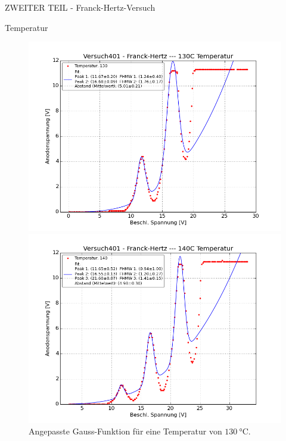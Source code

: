 \begin{appendix}
\begin{chapter}{ZWEITER TEIL - Franck-Hertz-Versuch}
\begin{section}{Temperatur}
      
      \newpage
      \begin{figure}[ht!]
        \centering
        \begin{minipage}{0.48\textwidth}
          \centering
          \includegraphics[width=\textwidth]
              {Figures/Versuch401-Franck-Hertz-130CTemperatur_Beschl_Spannung_Anodenspannung.png}
          \caption{Angepasste Gauss-Funktion für eine Temperatur von 
              $\SI{130}{\celsius}$.}
          \label{fig:AnhangFHT130C}
        \end{minipage} \quad
        \begin{minipage}{0.48\textwidth}
          \centering
          \includegraphics[width=\textwidth]
              {Figures/Versuch401-Franck-Hertz-140CTemperatur_Beschl_Spannung_Anodenspannung.png}

\end{minipage}
\end{figure}
\end{section}
\end{chapter}
\end{appendix}
